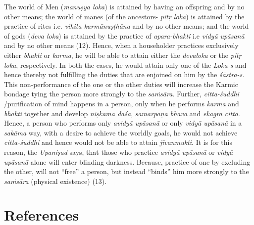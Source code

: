 The world of Men (\emph{manuṣya loka}) is attained by having an offspring and by no other means; the world of manes (of the ancestors- \emph{pitṛ loka}) is attained by the practice of rites i.e. \emph{vihita karmānuṣṭhāna} and by no other means; and the world of gods (\emph{deva loka}) is attained by the practice of \emph{apara-bhakti} i.e \emph{vidyā upāsanā} and by no other means (12). Hence, when a householder practices exclusively either \emph{bhakti} or \emph{karma}, he will be able to attain either the \emph{devaloka} or the \emph{pitṛ loka}, respectively. In both the cases, he would attain only one of the \emph{Loka-s} and hence thereby not fulfilling the duties that are enjoined on him by the \emph{śāstra-s}. This non-performance of the one or the other duties will increase the Karmic bondage tying the person more strongly to the \emph{saṁsāra}. Further, \emph{citta-śuddhi} /purification of mind happens in a person, only when he performs \emph{karma} and \emph{bhakti} together and develop \emph{niṣkāma daśā}, \emph{samarpaṇa bhāva} and \emph{ekāgra citta}. Hence, a person who performs only \emph{avidyā upāsanā} or only \emph{vidyā upāsanā} in a \emph{sakāma} way, with a desire to achieve the worldly goals, he would not achieve \emph{citta-śuddhi} and hence would not be able to attain \emph{jīvanmukti}. It is for this reason, the \emph{Upaniṣad} says, that those who practice \emph{avidyā upāsanā} or \emph{vidyā upāsanā} alone will enter blinding darkness. Because, practice of one by excluding the other, will not ``free'' a person, but instead ``binds'' him more strongly to the \emph{saṁsāra} (physical existence) (13).

\section*{References}

